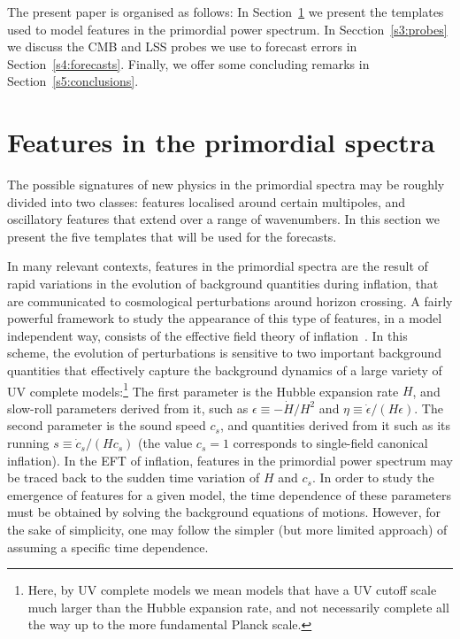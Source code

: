 \documentclass[12pt]{article}
\begin{document}
The present paper is organised as follows: In Section~\ref{s2:Templates} we present the templates used to model features in the primordial power spectrum. In Secction~\ref{s3:probes} we discuss the CMB and LSS probes we use to forecast errors in Section~\ref{s4:forecasts}. Finally, we offer some concluding remarks in Section~\ref{s5:conclusions}.


\setcounter{equation}{0} 
\section{Features in the primordial spectra} \label{s2:Templates}

The possible signatures of new physics in the primordial spectra may be roughly divided into two classes:  features localised around certain multipoles, and oscillatory features that extend over a range of wavenumbers. In this section we present the five templates that will be used for the forecasts.


In many relevant contexts, features in the primordial spectra are the result of rapid variations in the evolution of background quantities during inflation, that are communicated to cosmological perturbations around horizon crossing. A fairly powerful framework to study the appearance of this type of features, in a model independent way, consists of the effective field theory of inflation~\cite{Cheung:2007st}. In this scheme, the evolution of perturbations is sensitive to two important background quantities that effectively capture the background dynamics of a large variety of UV complete models:\footnote{Here, by UV complete models we mean models that have a UV cutoff scale much larger than the Hubble expansion rate, and not necessarily complete all the way up to the more fundamental Planck scale.} The first parameter is the Hubble expansion rate $H$, and slow-roll parameters derived from it, such as $\epsilon \equiv -\dot H / H^2$ and $\eta \equiv \dot \epsilon / (H \epsilon)$. The second parameter is the sound speed $c_s$, and quantities derived from it such as its running $s \equiv \dot c_s / (H c_s)$ (the value $c_s=1$ corresponds to single-field canonical inflation). In the EFT of inflation, features in the primordial power spectrum may be traced back to the sudden time variation of $H$ and $c_s$. In order to study the emergence of features for a given model, the time dependence of these parameters must be obtained by solving the background equations of motions. However, for the sake of simplicity, one may follow the simpler (but more limited approach) of assuming a specific time dependence. 
\end{document}
